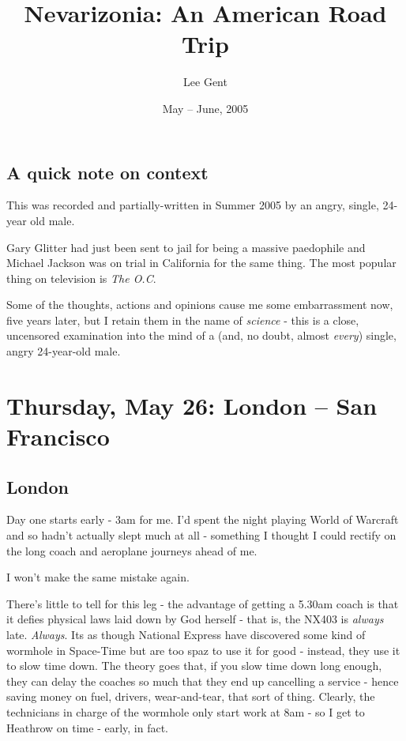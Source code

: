 \documentclass[a5paper,titlepage,11pt]{book}
\title{Nevarizonia: An American Road Trip}
\author{Lee Gent}
\date{May -- June, 2005}
\begin{document}
\frontmatter
\maketitle

\section*{A quick note on context}
This was recorded and partially-written in Summer 2005 by an angry, single, 24-year old male.

Gary Glitter had just been sent to jail for being a massive paedophile and Michael Jackson was on trial in California for the same thing.  The most popular thing on television is \emph{The O.C}.

Some of the thoughts, actions and opinions cause me some embarrassment now, five years later, but I retain them in the name of \emph{science} - this is a close, uncensored examination into the mind of a (and, no doubt, almost \emph{every}) single, angry 24-year-old male.

\mainmatter
\chapter[London -- San Francisco]{Thursday, May 26: London -- San Francisco}
\section*{London}
Day one starts early - 3am for me.  I'd spent the night playing World of Warcraft and so hadn't actually slept much at all - something I thought I could rectify on the long coach and aeroplane journeys ahead of me.

I won't make the same mistake again.

There's little to tell for this leg - the advantage of getting a 5.30am coach is that it defies physical laws laid down by God herself - that is, the NX403 is \emph{always} late.  \emph{Always}.  Its as though National Express have discovered some kind of wormhole in Space-Time but are too spaz to use it for good - instead, they use it to slow time down.  The theory goes that, if you slow time down long enough, they can delay the coaches so much that they end up cancelling a service - hence saving money on fuel, drivers, wear-and-tear, that sort of thing.  Clearly, the technicians in charge of the wormhole only start work at 8am - so I get to Heathrow on time - early, in fact.
\end{document}
